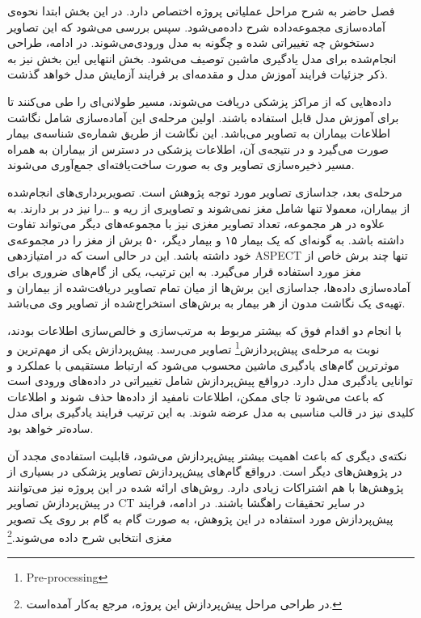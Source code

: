 

فصل حاضر به شرح مراحل عملیاتی پروژه اختصاص دارد.
در این بخش ابتدا نحوه‌ی آماده‌سازی مجموعه‌داده شرح داده‌می‌شود.
سپس بررسی می‌شود که این تصاویر دستخوش چه تغییراتی شده و چگونه به مدل ورودی‌می‌شوند.
در ادامه، طراحی انجام‌شده برای مدل یادگیری ماشین توصیف می‌شود.
بخش انتهایی این بخش نیز به ذکر 
جزئیات فرایند آموزش مدل و مقدمه‌ای بر فرایند آزمایش مدل خواهد گذشت.


داده‌هایی که از مراکز پزشکی دریافت می‌شوند، مسیر طولانی‌ای را طی می‌کنند تا برای آموزش مدل قابل استفاده باشند.
اولین مرحله‌ی این آماده‌سازی شامل نگاشت اطلاعات بیماران به تصاویر می‌باشد.
این نگاشت از طریق شماره‌ی شناسه‌ی بیمار صورت می‌گیرد 
و در نتیجه‌ی آن، اطلاعات پزشکی در دسترس از بیماران به همراه مسیر ذخیره‌سازی تصاویر وی به صورت ساخت‌یافته‌ای جمع‌آوری می‌شوند.\

مرحله‌ی بعد، جداسازی تصاویر مورد توجه پژوهش است.
تصویربرداری‌های انجام‌شده از بیماران، معمولا تنها شامل مغز نمی‌شوند و تصاویری از ریه و \dots را نیز در بر دارند.
به علاوه در هر مجموعه، تعداد تصاویر مغزی نیز با مجموعه‌های دیگر می‌تواند تفاوت داشته باشد.
به گونه‌ای که یک بیمار ۱۵ و بیمار دیگر، ۵۰ برش از مغز را در مجموعه‌ی خود داشته باشد.
این در حالی است که در امتیازدهی ASPECT تنها چند برش خاص از مغز مورد استفاده قرار می‌گیرد.
به این ترتیب، یکی از گام‌های ضروری برای آماده‌سازی داده‌ها، جداسازی این برش‌ها از میان تمام 
تصاویر دریافت‌شده از بیماران و تهیه‌ی یک نگاشت مدون از هر بیمار به برش‌های استخراج‌شده از تصاویر وی می‌باشد.

با انجام دو اقدام فوق که بیشتر مربوط به مرتب‌سازی و خالص‌سازی اطلاعات بودند، نوبت به مرحله‌ی 
پیش‌پردازش\footnote{Pre-processing}
تصاویر می‌رسد.
پیش‌پردازش یکی از مهم‌ترین و موثرترین گام‌های یادگیری ماشین محسوب می‌شود که ارتباط مستقیمی با عملکرد و توانایی یادگیری مدل دارد. 
درواقع پیش‌پردازش شامل تغییراتی در داده‌های ورودی است که باعث می‌شود تا جای ممکن، اطلاعات نامفید از داد‌ه‌ها حذف شوند و اطلاعات کلیدی نیز در قالب مناسبی به مدل عرضه شوند.
به این ترتیب فرایند یادگیری برای مدل ساده‌تر خواهد بود.

نکته‌ی دیگری که باعث اهمیت بیشتر پیش‌پردازش می‌شود، قابلیت استفاده‌ی مجدد آن در پژوهش‌های دیگر است.
درواقع گام‌های پیش‌پردازش تصاویر پزشکی در بسیاری از پژوهش‌ها با هم اشتراکات زیادی دارد.
روش‌های ارائه شده در این پروژه نیز می‌توانند در پیش‌پردازش تصاویر CT در سایر تحقیقات راهگشا باشند.
در ادامه، فرایند پیش‌پردازش مورد استفاده در این پژوهش، به صورت گام به گام بر روی یک تصویر مغزی انتخابی شرح داده می‌شوند.\footnote{در طراحی مراحل پیش‌پردازش این پروژه، مرجع \cite{ma2020medical} به‌کار آمده‌است.}

